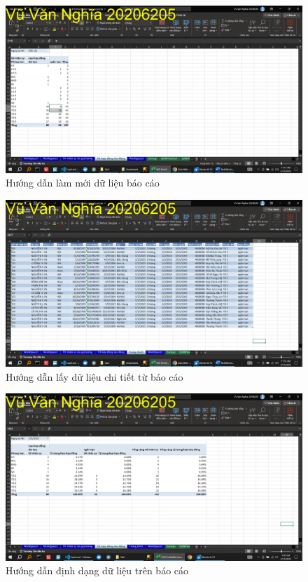 \documentclass{article}
\begin{document}
\begin{figure}[H]
    \centering
    \includegraphics[scale = 0.15]{Bai1/HuongDan/2.png}
    \caption{Hướng dẫn làm mới dữ liệu báo cáo}
\end{figure}






\begin{figure}[H]
    \centering
    \includegraphics[scale = 0.15]{Bai1/HuongDan/3.png}
    \caption{Hướng dẫn lấy dữ liệu chi tiết từ báo cáo}
\end{figure}






\begin{figure}[H]
    \centering
    \includegraphics[scale = 0.15]{Bai1/HuongDan/4.png}
    \caption{Hướng dẫn định dạng dữ liệu trên báo cáo}
\end{figure}
\end{document}
